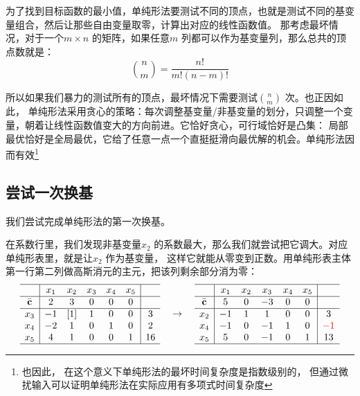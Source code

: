 \documentclass{../mathnotes-art}
\renewcommand{\c}{\mathbf{c}}
\begin{document}
为了找到目标函数的最小值，单纯形法要测试不同的顶点，也就是测试不同的基变量组合，然后让那些自由变量取零，计算出对应的线性函数值。
那考虑最坏情况，对于一个\(m \times n\) 的矩阵，如果任意\(m\) 列都可以作为基变量列，那么总共的顶点数就是：\[
    \binom{n}{m} = \frac{n!}{m!(n-m)!}
\]

所以如果我们暴力的测试所有的顶点，最坏情况下需要测试\(\binom{n}{m}\) 次。也正因如此，
单纯形法采用贪心的策略：每次调整基变量/非基变量的划分，只调整一个变量，朝着让线性函数值变大的方向前进。它恰好贪心，可行域恰好是凸集：
局部最优恰好是全局最优，它给了任意一点一个直挺挺滑向最优解的机会。单纯形法因而有效\footnote{也因此，
    在这个意义下单纯形法的最坏时间复杂度是指数级别的，
但通过微扰输入可以证明单纯形法在实际应用有多项式时间复杂度\cite{2374}}

\subsection{尝试一次换基}

我们尝试完成单纯形法的第一次换基。

在系数行里，我们发现非基变量\(x_{2}\) 的系数最大，那么我们就尝试把它调大。对应单纯形表里，就是让\(x_{2}\) 作为基变量，
这样它就能从零变到正数。用单纯形表主体第一行第二列做高斯消元的主元，把该列剩余部分消为零：
\[
    \begin{array}{c|*{5}{c}|c}
        \hline
        & x_1 & x_2 & x_3 & x_4 & x_5 &    \\ \hline
        \bar{\c} & 2  & 3  & 0   & 0   & 0   &    \\ \hline
        x_{3} & -1  & [1]   & 1   & 0   & 0   & 3  \\
        x_{4} & -2  & 1   & 0   & 1   & 0   & 2  \\
        x_{5} & 4   & 1   & 0   & 0   & 1   & 16 \\ \hline
    \end{array}
    \quad \to \quad
    \begin{array}{c|*{5}{c}|c}
        \hline
        & x_1 & x_2 & x_3 & x_4 & x_5 &    \\ \hline
        \bar{\c} & 5  & 0  & -3   & 0   & 0   &    \\ \hline
        x_{2} & -1  & 1   & 1   & 0   & 0   & 3  \\
        x_{4} & -1  & 0   & -1   & 1   & 0   & \color{red}{-1} \\
        x_{5} & 5   & 0   & -1   & 0   & 1   & 13 \\ \hline
    \end{array}
\]
\end{document}
